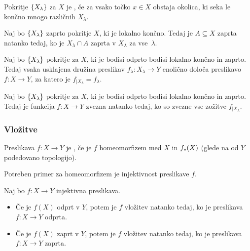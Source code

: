 \begin{definicija}
    Pokritje $\left\{X_\lambda\right\}$ za $X$ je , če za vsako točko $x \in X$ obstaja okolica, ki seka le končno mnogo različnih $X_\lambda$.
\end{definicija}

\begin{lema}
    Naj bo $\left\{X_\lambda\right\}$ zaprto pokritje $X$, ki je lokalno končno. Tedaj je $A \subseteq X$ zaprta natanko tedaj, ko je $X_\lambda \cap A$ zaprta v $X_\lambda$ za vse~$\lambda$.
\end{lema}

\begin{izrek}
    Naj bo $\left\{X_\lambda\right\}$ pokritje za $X$, ki je bodisi odprto bodisi lokalno končno in zaprto. Tedaj vsaka usklajena družina preslikav $f_\lambda: X_\lambda \to Y$ enolično določa preslikavo $f: X \to Y$, za katero je $f_{|X_\lambda} = f_\lambda$.
\end{izrek}

\begin{posledica}
    Naj bo $\left\{X_\lambda\right\}$ pokritje za $X$, ki je bodisi odprto bodisi lokalno končno in zaprto. Tedaj je funkcija $f: X \to Y$ zvezna natanko tedaj, ko so zvezne vse zožitve $f_{|X_\lambda}$.
\end{posledica}

\subsubsection{Vložitve}
\begin{definicija}
    Preslikava $f: X \to Y$ je , če je $f$ homeomorfizem med $X$ in $f_{*}(X)$ (glede na od $Y$ podedovano topologijo).
\end{definicija}

\begin{opomba}
    Potreben primer za homeomorfizem je injektivnost preslikave $f$. 
\end{opomba}

\begin{trditev}
    Naj bo $f: X \to Y$ injektivna preslikava.
    \begin{itemize}
        \item Če je $f(X)$ odprt v $Y$, potem je $f$ vložitev natanko tedaj, ko je preslikava $f: X \to Y$ odprta.
        \item Če je $f(X)$ zaprt v $Y$, potem je $f$ vložitev natanko tedaj, ko je preslikava $f: X \to Y$ zaprta.
    \end{itemize}
\end{trditev}

